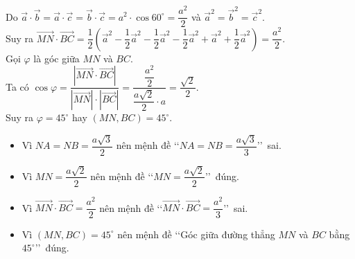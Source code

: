 \begin{ex}
{		Do $\overrightarrow{a}\cdot\overrightarrow{b}=\overrightarrow{a}\cdot\overrightarrow{c}=\overrightarrow{b}\cdot\overrightarrow{c}=a^2\cdot\cos 60^{\circ}=\dfrac{a^2}{2}$ và $\overrightarrow a^2=\overrightarrow b^2=\overrightarrow c^2$.\\
		Suy ra $\overrightarrow{MN}\cdot\overrightarrow{BC}=\dfrac{1}{2}\left(\overrightarrow a^2-\dfrac{1}{2}\overrightarrow a^2-\dfrac{1}{2}\overrightarrow a^2-\dfrac{1}{2}\overrightarrow a^2+\overrightarrow a^2+\dfrac{1}{2}\overrightarrow a^2\right)=\dfrac{a^2}{2}$.\\
		Gọi $\varphi$ là góc giữa $MN$ và $BC$.\\
		Ta có $\cos\varphi=\dfrac{\left|\overrightarrow{MN}\cdot\overrightarrow{BC}\right|}{\left|\overrightarrow{MN}\right|\cdot\left|\overrightarrow{BC}\right|}=\dfrac{\dfrac{a^2}{2}}{\dfrac{a\sqrt{2}}{2}\cdot a}=\dfrac{\sqrt{2}}{2}$.\\
		Suy ra $\varphi=45^{\circ}$ hay $(MN,BC)=45^{\circ}$.
		\begin{itemize}
			\item Vì $NA=NB=\dfrac{a\sqrt{3}}{2}$ nên mệnh đề \lq\lq $NA=NB=\dfrac{a\sqrt{3}}{3}$\rq\rq\, sai.
			\item Vì $MN=\dfrac{a\sqrt{2}}{2}$ nên mệnh đề \lq\lq $MN=\dfrac{a\sqrt{2}}{2}$\rq\rq\, đúng.
			\item Vì $\overrightarrow{MN}\cdot\overrightarrow{BC}=\dfrac{a^2}{2}$ nên mệnh đề \lq\lq $\overrightarrow{MN}\cdot\overrightarrow{BC}=\dfrac{a^2}{3}$\rq\rq\, sai.
			\item Vì $(MN,BC)=45^{\circ}$ nên mệnh đề \lq\lq Góc giữa đường thẳng $MN$ và $BC$ bằng $45^{\circ}$\rq\rq\, đúng.
		\end{itemize}
	}
\end{ex}
